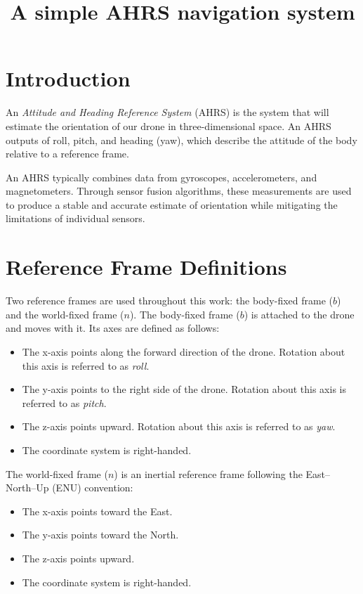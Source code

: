 \documentclass{article}
\title{A simple AHRS navigation system}
\author{}
\date{}
\begin{document}
	\maketitle


\section{Introduction}

	An \textit{Attitude and Heading Reference System} (AHRS) is the system that will estimate the orientation of our drone in three-dimensional space. An AHRS outputs of roll, pitch, and heading (yaw), which describe the attitude of the body relative to a reference frame.

	\vspace{1em}

	\noindent An AHRS typically combines data from gyroscopes, accelerometers, and magnetometers. Through sensor fusion algorithms, these measurements are used to produce a stable and accurate estimate of orientation while mitigating the limitations of individual sensors.

\section{Reference Frame Definitions}

Two reference frames are used throughout this work: the body-fixed frame ($b$) and the world-fixed frame ($n$).
The body-fixed frame ($b$) is attached to the drone and moves with it. Its axes are defined as follows:

\begin{itemize}
	\item The x-axis points along the forward direction of the drone. Rotation about this axis is referred to as \emph{roll}.
	\item The y-axis points to the right side of the drone. Rotation about this axis is referred to as \emph{pitch}.
	\item The z-axis points upward. Rotation about this axis is referred to as \emph{yaw}.
	\item The coordinate system is right-handed.
\end{itemize}

\noindent The world-fixed frame ($n$) is an inertial reference frame following the East--North--Up (ENU) convention:

\begin{itemize}
	\item The x-axis points toward the East.
	\item The y-axis points toward the North.
	\item The z-axis points upward.
	\item The coordinate system is right-handed.
\end{itemize}
\end{document}
